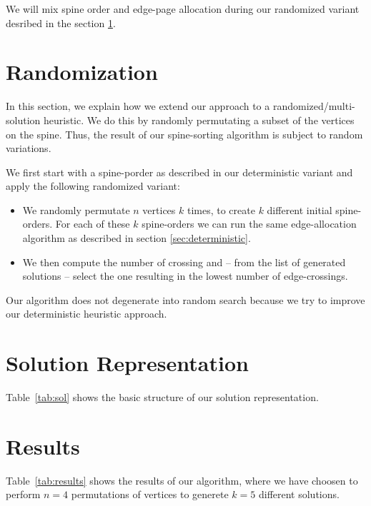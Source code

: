 \documentclass{scrartcl}
\begin{document}
We will mix spine order and edge-page allocation during our randomized
variant desribed in the section \ref{sec:randomization}.




\section{Randomization}
\label{sec:randomization}
In this section, we explain how we extend our approach to a
randomized/multi-solution heuristic. We do this by randomly
permutating a subset of the vertices on the spine. Thus, the result of
our spine-sorting algorithm is subject to random variations.

We first start with a spine-porder as described in our deterministic
variant and apply the following randomized variant:

\begin{itemize}
\item We randomly permutate $n$ vertices $k$ times, to create $k$ different
initial spine-orders. For each of these $k$ spine-orders we can run
the same edge-allocation algorithm as described in section \ref{sec:deterministic}. 

\item We then compute the number of
crossing and -- from the list of generated solutions -- select the one
resulting in the lowest number of edge-crossings. 
\end{itemize}



Our algorithm does not degenerate into random search because we try to
improve our deterministic heuristic approach.


\section{Solution Representation}

Table~\ref{tab:sol} shows the basic structure of our solution representation.

\section{Results}

Table~\ref{tab:results} shows the results of our algorithm, where we
have choosen to perform $n=4$ permutations of vertices to generete
$k=5$ different solutions.
\end{document}
